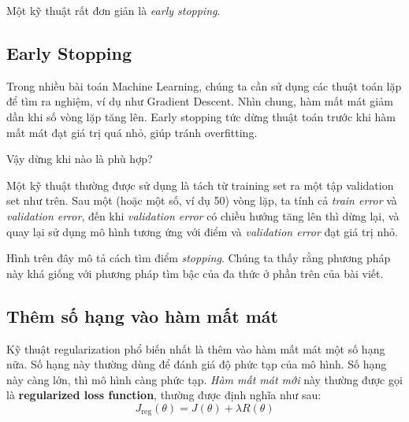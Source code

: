Một kỹ thuật rất đơn giản là \textit{early stopping}. 
 
 
 
\subsection{Early Stopping}
Trong nhiều bài toán Machine Learning, chúng ta cần sử dụng các thuật toán lặp để tìm ra nghiệm, ví dụ như Gradient Descent. Nhìn chung, hàm mất mát giảm dần khi số vòng lặp tăng lên. Early stopping tức dừng thuật toán trước khi hàm mất mát đạt giá trị quá nhỏ, giúp tránh overfitting. 
 
Vậy dừng khi nào là phù hợp? 
 
Một kỹ thuật thường được sử dụng là tách từ training set ra một tập validation set như trên. Sau một (hoặc một số, ví dụ 50) vòng lặp, ta tính cả \textit{train error} và \textit{validation error}, đến khi \textit{validation error} có chiều hướng tăng lên thì dừng lại, và quay lại sử dụng mô hình tương ứng với điểm và \textit{validation error} đạt giá trị nhỏ. 
 


Hình trên đây mô tả cách tìm điểm \textit{stopping}. Chúng ta thấy rằng phương pháp này khá giống với phương pháp tìm bậc của đa thức ở phần trên của bài viết. 
 
 
\subsection{Thêm số hạng vào hàm mất mát}
 
 
Kỹ thuật regularization phổ biến nhất là thêm vào hàm mất mát một số hạng nữa. Số hạng này thường dùng để đánh giá độ phức tạp của mô hình. Số hạng này càng lớn, thì mô hình càng phức tạp. \textit{Hàm mất mát mới} này thường được gọi là \textbf{regularized loss function}, thường được định nghĩa như sau: 
\begin{equation*} 
J_{\text{reg}}(\theta) = J(\theta) + \lambda R(\theta) 
\end{equation*} 
 
